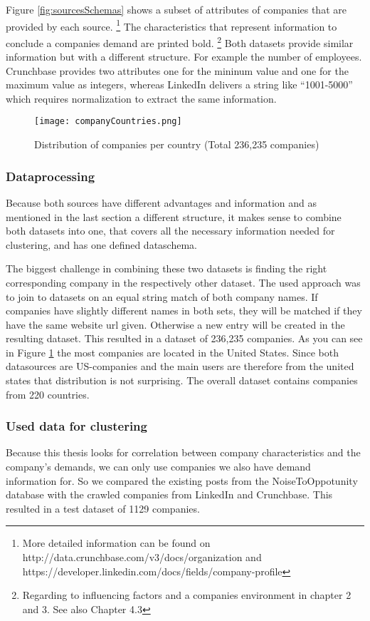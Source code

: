 Figure \ref{fig:sourcesSchemas} shows a subset of attributes of companies that are provided by each source. \footnote{More detailed information can be found on http://data.crunchbase.com/v3/docs/organization and https://developer.linkedin.com/docs/fields/company-profile }
The characteristics that represent information to conclude a companies demand are printed bold. \footnote{Regarding to influencing factors
and a companies environment in chapter 2 and 3. See also Chapter 4.3} Both datasets provide similar information but with a different structure.
For example the number of employees. Crunchbase provides two attributes one for the mininum value and one for the maximum value as integers,
whereas LinkedIn delivers a string like ``1001-5000'' which requires normalization to extract the same information.

\begin{figure}[ht]
\texttt{[image: companyCountries.png]}
\centering
\caption{Distribution of companies per country (Total 236,235 companies)}
\label{fig:countryDistribution}
\end{figure}


\subsubsection{Dataprocessing}
Because both sources have different advantages and information and as mentioned in the last section a different structure,
it makes sense to combine both datasets into one, that covers all the necessary information needed for clustering,
and has one defined dataschema.

The biggest challenge in combining these two datasets is finding the right corresponding company in the respectively
other dataset.
The used approach was to join to datasets on an equal string match of both company names. If companies have slightly different names
in both sets, they will be matched if they have the same website url given. Otherwise a new entry will be created in
the resulting dataset. This resulted in a dataset of 236,235 companies. As you can see in Figure \ref{fig:countryDistribution}
the most companies are located in the United States. Since both datasources are US-companies and the main users are therefore
from the united states that distribution is not surprising. The overall dataset contains companies from 220 countries.


\subsubsection{Used data for clustering}
\label{dataSubset}
Because this thesis looks for correlation between company characteristics and the company's demands, we can only use companies
we also have demand information for. So we compared the existing posts from the NoiseToOppotunity\cite{n2o} database with
the crawled companies from LinkedIn and Crunchbase. This resulted in a test dataset of 1129 companies.

